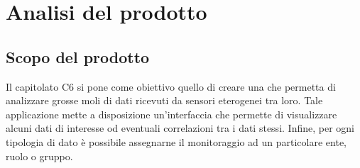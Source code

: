 \section{Analisi del prodotto}
	\subsection{Scopo del prodotto}
		Il capitolato C6 si pone come obiettivo quello di creare una  che permetta di analizzare grosse moli di dati ricevuti da sensori eterogenei tra loro. Tale applicazione mette a disposizione un'interfaccia che permette di visualizzare alcuni dati di interesse od eventuali correlazioni tra i dati stessi. Infine, per ogni tipologia di dato è possibile assegnarne il monitoraggio ad un particolare ente, ruolo o gruppo.
		
